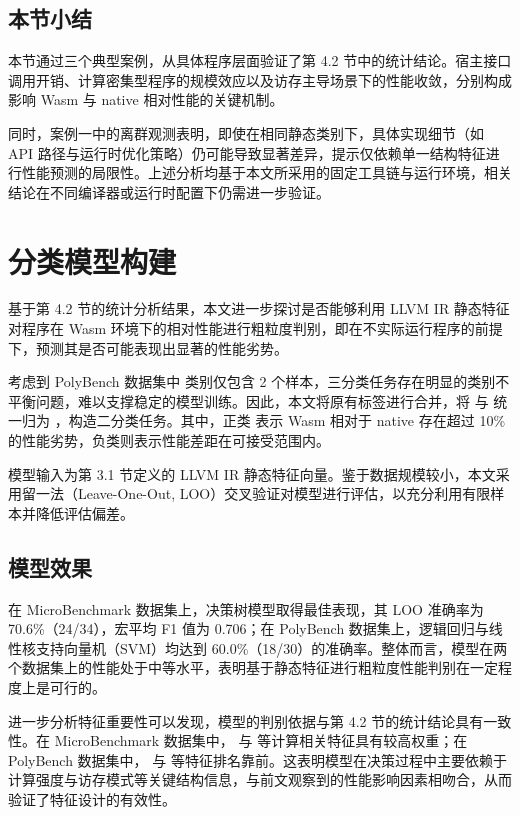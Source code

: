 \subsection{本节小结}

本节通过三个典型案例，从具体程序层面验证了第 4.2 节中的统计结论。宿主接口调用开销、计算密集型程序的规模效应以及访存主导场景下的性能收敛，分别构成影响 Wasm 与 native 相对性能的关键机制。

同时，案例一中的离群观测表明，即使在相同静态类别下，具体实现细节（如 API 路径与运行时优化策略）仍可能导致显著差异，提示仅依赖单一结构特征进行性能预测的局限性。上述分析均基于本文所采用的固定工具链与运行环境，相关结论在不同编译器或运行时配置下仍需进一步验证。


\section{分类模型构建}

基于第 4.2 节的统计分析结果，本文进一步探讨是否能够利用 LLVM IR 静态特征对程序在 Wasm 环境下的相对性能进行粗粒度判别，即在不实际运行程序的前提下，预测其是否可能表现出显著的性能劣势。

考虑到 PolyBench 数据集中  类别仅包含 2 个样本，三分类任务存在明显的类别不平衡问题，难以支撑稳定的模型训练。因此，本文将原有标签进行合并，将  与  统一归为 ，构造二分类任务。其中，正类  表示 Wasm 相对于 native 存在超过 10\% 的性能劣势，负类则表示性能差距在可接受范围内。

模型输入为第 3.1 节定义的 LLVM IR 静态特征向量。鉴于数据规模较小，本文采用留一法（Leave-One-Out, LOO）交叉验证对模型进行评估，以充分利用有限样本并降低评估偏差。

\subsection{模型效果}

在 MicroBenchmark 数据集上，决策树模型取得最佳表现，其 LOO 准确率为 70.6\%（24/34），宏平均 F1 值为 0.706；在 PolyBench 数据集上，逻辑回归与线性核支持向量机（SVM）均达到 60.0\%（18/30）的准确率。整体而言，模型在两个数据集上的性能处于中等水平，表明基于静态特征进行粗粒度性能判别在一定程度上是可行的。

进一步分析特征重要性可以发现，模型的判别依据与第 4.2 节的统计结论具有一致性。在 MicroBenchmark 数据集中， 与  等计算相关特征具有较高权重；在 PolyBench 数据集中， 与  等特征排名靠前。这表明模型在决策过程中主要依赖于计算强度与访存模式等关键结构信息，与前文观察到的性能影响因素相吻合，从而验证了特征设计的有效性。

